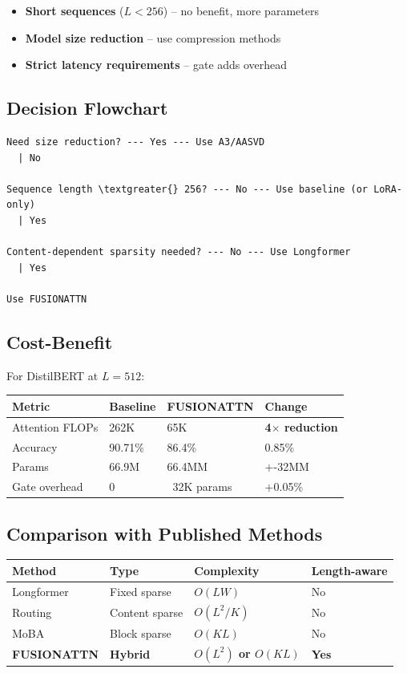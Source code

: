 \begin{itemize}
\item \textbf{Short sequences} ($L < 256$) -- no benefit, more parameters
\item \textbf{Model size reduction} -- use compression methods
\item \textbf{Strict latency requirements} -- gate adds overhead

\end{itemize}
\subsection{Decision Flowchart}

\begin{lstlisting}
Need size reduction? --- Yes --- Use A3/AASVD
  | No
   
Sequence length \textgreater{} 256? --- No --- Use baseline (or LoRA-only)
  | Yes
   
Content-dependent sparsity needed? --- No --- Use Longformer
  | Yes
   
Use FUSIONATTN
\end{lstlisting}

\subsection{Cost-Benefit}

For DistilBERT at $L = 512$:

\begin{table}[H]
\centering
\small
\begin{tabular}{llll}
\toprule
\textbf{Metric} & \textbf{Baseline} & \textbf{FUSIONATTN} & \textbf{Change} \\
\midrule
Attention FLOPs & 262K & 65K & \textbf{4$\times$ reduction} \\
Accuracy & 90.71\% & 86.4\% & 0.85\% \\
Params & 66.9M & 66.4MM & +-32MM \\
Gate overhead & 0 & ~32K params & +0.05\% \\
\bottomrule
\end{tabular}
\end{table}

\subsection{Comparison with Published Methods}

\begin{table}[H]
\centering
\small
\begin{tabular}{llll}
\toprule
\textbf{Method} & \textbf{Type} & \textbf{Complexity} & \textbf{Length-aware} \\
\midrule
Longformer & Fixed sparse & $O(LW)$ & No \\
Routing & Content sparse & $O(L^2/K)$ & No \\
MoBA & Block sparse & $O(KL)$ & No \\
\textbf{FUSIONATTN} & \textbf{Hybrid} & \textbf{$O(L^2)$ or $O(KL)$} & \textbf{Yes} \\
\bottomrule
\end{tabular}
\end{table}

